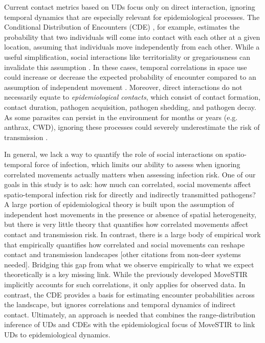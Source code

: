 \documentclass[letterpaper]{article}
\begin{document}
Current contact metrics based on UDs focus only on direct interaction, ignoring temporal dynamics that are especially relevant for epidemiological processes. The Conditional Distribution of Encounters (CDE) \citep{Noonan2021}, for example, estimates the probability that two individuals will come into contact with each other at a given location, assuming that individuals move independently from each other.
While a useful simplification, social interactions like territoriality or gregariousness can invalidate this assumption \citep{Manlove2018,Sah2018}. In these cases, temporal correlations in space use could increase or decrease the expected probability of encounter compared to an assumption of independent movement \citep{Kjaer2008,Schauber2015a}. 
Moreover, direct interactions do not necessarily equate to \emph{epidemiological contacts}, which consist of contact formation, contact duration, pathogen acquisition, pathogen shedding, and pathogen decay. As some parasites can persist in the environment for months or years (e.g. anthrax, CWD), ignoring these processes could severely underestimate the risk of transmission \citep{Wilber2022,Yang2023,Richardson2015}.

In general, we lack a way to quantify the role of social interactions on spatio-temporal force of infection, which limits our ability to assess when ignoring correlated movements actually matters when assessing infection risk. One of our goals in this study is to ask: how much can correlated, social movements affect spatio-temporal infection risk for directly and indirectly transmitted pathogens? A large portion of epidemiological theory is built upon the assumption of independent host movements in the presence or absence of spatial heterogeneity, but there is very little theory that quantifies how correlated movements affect contact and transmission risk.  In contrast, there is a large body of empirical work that empirically quantifies how correlated and social movements can reshape contact and transmission landscapes \citep{Kjaer2008,Grear2010,Schauber2015a,Webber2023} [other citations from non-deer systems needed].  Bridging this gap from what we observe empirically to what we expect theoretically is a key missing link. While the previously developed MoveSTIR implicitly accounts for such correlations, it only applies for observed data. In contrast, the CDE provides a basis for estimating encounter probabilities across the landscape, but ignores correlations and temporal dynamics of indirect contact.
Ultimately, an approach is needed that combines the range-distribution inference of UDs and CDEs \citep{Alston2022,Noonan2021} with the epidemiological focus of MoveSTIR to link UDs to epidemiological dynamics. 
\end{document}
